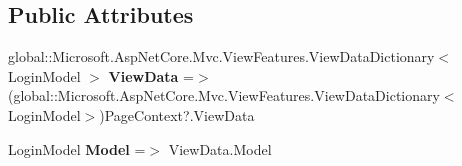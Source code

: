 \subsection*{Public Attributes}
\begin{DoxyCompactItemize}
\item 
\mbox{\label{class_projeto_e_s_w_1_1_areas_1_1_identity_1_1_pages_1_1_account_1_1_areas___identity___pages___account___login_a3e64f5fee1bae82d6fc9c33b1ec00700}} 
global\+::\+Microsoft.\+Asp\+Net\+Core.\+Mvc.\+View\+Features.\+View\+Data\+Dictionary$<$ Login\+Model $>$ {\bfseries View\+Data} =$>$ (global\+::\+Microsoft.\+Asp\+Net\+Core.\+Mvc.\+View\+Features.\+View\+Data\+Dictionary$<$Login\+Model$>$)Page\+Context?.View\+Data
\item 
\mbox{\label{class_projeto_e_s_w_1_1_areas_1_1_identity_1_1_pages_1_1_account_1_1_areas___identity___pages___account___login_a24ed848f86d222bf04167eb416995eb4}} 
Login\+Model {\bfseries Model} =$>$ View\+Data.\+Model
\end{DoxyCompactItemize}
